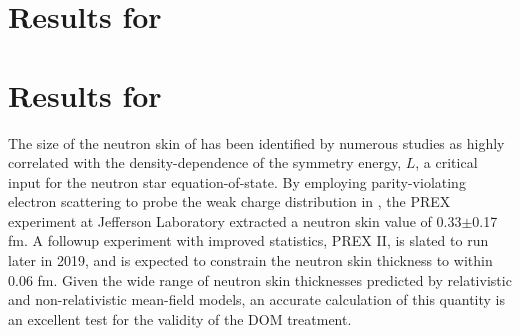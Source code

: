 \section{Results for \snTwelveFour}

\section{Results for \pbEight}
The size of the neutron skin of \pbEight has been identified by numerous studies as highly
correlated with the density-dependence of the symmetry energy, $L$, a critical input for the neutron
star equation-of-state. By employing parity-violating electron scattering to probe the
weak charge distribution in \pbEight, the PREX experiment at Jefferson Laboratory extracted a
\pbEight neutron skin value of 0.33$\pm$0.17 fm. A followup experiment with improved statistics, PREX II,
is slated to run later in 2019, and is expected to constrain the \pbEight neutron skin thickness to
within 0.06 fm. Given the wide range of \pbEight neutron skin thicknesses predicted by relativistic
and non-relativistic mean-field models, an accurate calculation of this quantity is an excellent
test for the validity of the DOM treatment.


\afterpage{\clearpage}
